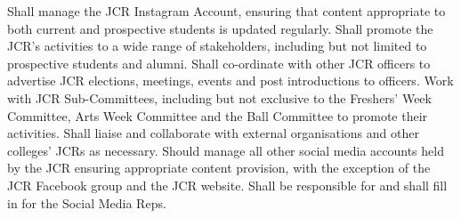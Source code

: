 Shall manage the JCR Instagram Account, ensuring that content appropriate to both current and prospective students is updated regularly. 
Shall promote the JCR's activities to a wide range of stakeholders, including but not limited to prospective students and alumni. 
Shall co-ordinate with other JCR officers to advertise JCR elections, meetings, events and post introductions to officers. 
Work with JCR Sub-Committees, including but not exclusive to the Freshers' Week Committee, Arts Week Committee and the Ball Committee to promote their activities. 
Shall liaise and collaborate with external organisations and other colleges' JCRs as necessary. 
Should manage all other social media accounts held by the JCR ensuring appropriate content provision, with the exception of the JCR Facebook group and the JCR website.
Shall be responsible for and shall fill in for the Social Media Reps.
